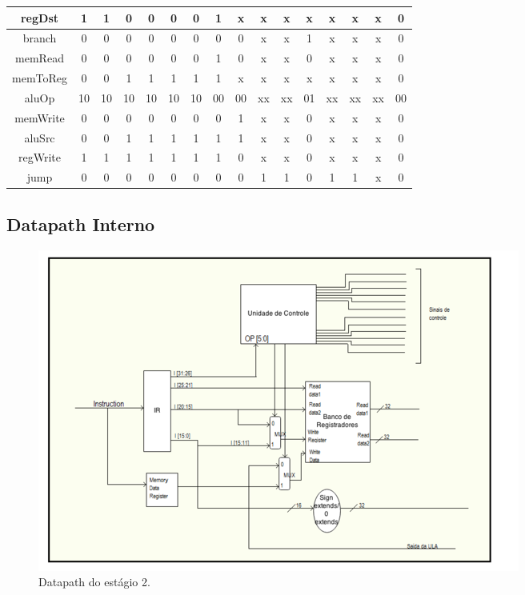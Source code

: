\begin{center}
\begin{longtable}[pos]{| c | c | c | c | c | c | c | c | c | c | c | c | c | c | c | c |}
			regDst & 1 & 1 & 0 & 0 & 0 & 0 & 1 & x & x & x & x & x&x &x&0\\ \hline
            branch & 0 & 0 & 0 & 0 & 0 & 0 & 0 & 0 & x & x & 1 & x&x&x&0\\ \hline
            memRead & 0 & 0 & 0 & 0 & 0 & 0 & 1 & 0 & x & x & 0 & x&x&x&0\\ \hline
            memToReg & 0 & 0 & 1 & 1 & 1 & 1 & 1 & x & x & x & x & x&x&x&0\\ \hline
            aluOp & 10 & 10 & 10 & 10 & 10 & 10 & 00 & 00 & xx & xx & 01& xx&xx&xx&00 \\ \hline
            memWrite & 0 & 0 & 0 & 0 & 0 & 0 & 0 & 1 & x & x & 0& x&x&x&0\\ \hline
            aluSrc & 0 & 0 & 1 & 1 & 1 & 1 & 1 & 1 & x & x & 0&x&x&x&0\\ \hline
            regWrite & 1 & 1 & 1 & 1 & 1 & 1 & 1 & 0 & x & x & 0&x&x&x&0\\ \hline
            jump & 0 & 0 & 0 & 0 & 0 & 0 & 0 & 0 & 1 & 1 & 0&1&1&x&0\\ \hline
		\end{longtable}
	\end{center}
    
	
	\subsection{Datapath Interno}
	
	\begin{figure}[ht]
		\begin{center}
		\includegraphics{./datapath/step2.png}
		\caption*{Datapath do estágio 2.}
		\end{center}
	\end{figure}